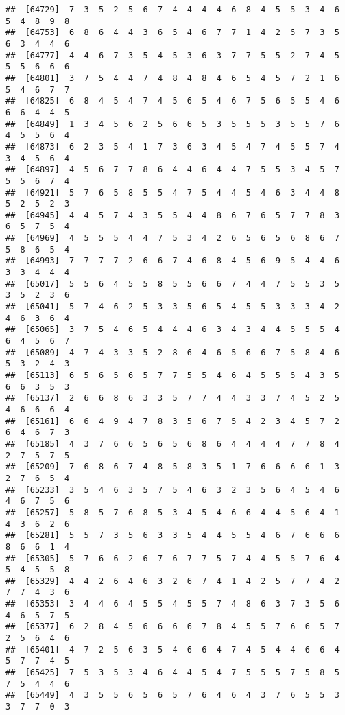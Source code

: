 \documentclass[
]{book}
\begin{document}
\begin{verbatim}
##  [64729]  7  3  5  2  5  6  7  4  4  4  4  6  8  4  5  5  3  4  6  5  4  8  9  8
##  [64753]  6  8  6  4  4  3  6  5  4  6  7  7  1  4  2  5  7  3  5  6  3  4  4  6
##  [64777]  4  4  6  7  3  5  4  5  3  6  3  7  7  5  5  2  7  4  5  5  5  6  6  6
##  [64801]  3  7  5  4  4  7  4  8  4  8  4  6  5  4  5  7  2  1  6  5  4  6  7  7
##  [64825]  6  8  4  5  4  7  4  5  6  5  4  6  7  5  6  5  5  4  6  6  6  4  4  5
##  [64849]  1  3  4  5  6  2  5  6  6  5  3  5  5  5  3  5  5  7  6  4  5  5  6  4
##  [64873]  6  2  3  5  4  1  7  3  6  3  4  5  4  7  4  5  5  7  4  3  4  5  6  4
##  [64897]  4  5  6  7  7  8  6  4  4  6  4  4  7  5  5  3  4  5  7  5  5  6  7  4
##  [64921]  5  7  6  5  8  5  5  4  7  5  4  4  5  4  6  3  4  4  8  5  2  5  2  3
##  [64945]  4  4  5  7  4  3  5  5  4  4  8  6  7  6  5  7  7  8  3  6  5  7  5  4
##  [64969]  4  5  5  5  4  4  7  5  3  4  2  6  5  6  5  6  8  6  7  5  8  6  5  4
##  [64993]  7  7  7  7  2  6  6  7  4  6  8  4  5  6  9  5  4  4  6  3  3  4  4  4
##  [65017]  5  5  6  4  5  5  8  5  5  6  6  7  4  4  7  5  5  3  5  3  5  2  3  6
##  [65041]  5  7  4  6  2  5  3  3  5  6  5  4  5  5  3  3  3  4  2  4  6  3  6  4
##  [65065]  3  7  5  4  6  5  4  4  4  6  3  4  3  4  4  5  5  5  4  6  4  5  6  7
##  [65089]  4  7  4  3  3  5  2  8  6  4  6  5  6  6  7  5  8  4  6  5  3  2  4  3
##  [65113]  6  5  6  5  6  5  7  7  5  5  4  6  4  5  5  5  4  3  5  6  6  3  5  3
##  [65137]  2  6  6  8  6  3  3  5  7  7  4  4  3  3  7  4  5  2  5  4  6  6  6  4
##  [65161]  6  6  4  9  4  7  8  3  5  6  7  5  4  2  3  4  5  7  2  6  4  6  7  3
##  [65185]  4  3  7  6  6  5  6  5  6  8  6  4  4  4  4  7  7  8  4  2  7  5  7  5
##  [65209]  7  6  8  6  7  4  8  5  8  3  5  1  7  6  6  6  6  1  3  2  7  6  5  4
##  [65233]  3  5  4  6  3  5  7  5  4  6  3  2  3  5  6  4  5  4  6  4  6  7  5  6
##  [65257]  5  8  5  7  6  8  5  3  4  5  4  6  6  4  4  5  6  4  1  4  3  6  2  6
##  [65281]  5  5  7  3  5  6  3  3  5  4  4  5  5  4  6  7  6  6  6  8  6  6  1  4
##  [65305]  5  7  6  6  2  6  7  6  7  7  5  7  4  4  5  5  7  6  4  5  4  5  5  8
##  [65329]  4  4  2  6  4  6  3  2  6  7  4  1  4  2  5  7  7  4  2  7  7  4  3  6
##  [65353]  3  4  4  6  4  5  5  4  5  5  7  4  8  6  3  7  3  5  6  4  6  5  7  5
##  [65377]  6  2  8  4  5  6  6  6  6  7  8  4  5  5  7  6  6  5  7  2  5  6  4  6
##  [65401]  4  7  2  5  6  3  5  4  6  6  4  7  4  5  4  4  6  6  4  5  7  7  4  5
##  [65425]  7  5  3  5  3  4  6  4  4  5  4  7  5  5  5  7  5  8  5  7  5  4  4  6
##  [65449]  4  3  5  5  6  5  6  5  7  6  4  6  4  3  7  6  5  5  3  3  7  7  0  3

\end{verbatim}
\end{document}
